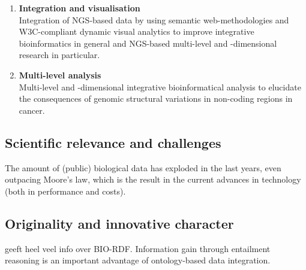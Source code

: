 \documentclass[twoside,fontsize=10pt]{article}
\begin{document}
\begin{enumerate}
\item \textbf{Integration and visualisation} \\
Integration of NGS-based data by using semantic web-methodologies and W3C-compliant dynamic visual analytics to improve integrative bioinformatics in general and NGS-based multi-level and -dimensional research in particular.
\item \textbf{Multi-level analysis} \\
Multi-level and -dimensional integrative bioinformatical analysis to elucidate the consequences of genomic structural variations in non-coding regions in cancer.
\end{enumerate}
\subsection*{Scientific relevance and challenges} %
The amount of (public) biological data has exploded in the last years, even outpacing Moore's law, which is the result in the current advances in technology (both in performance and costs).
\subsection*{Originality and innovative character} 
\cite{Sahoo2008} geeft heel veel info over BIO-RDF. Information gain through entailment reasoning is an important advantage of ontology-based data integration.
\end{document}
